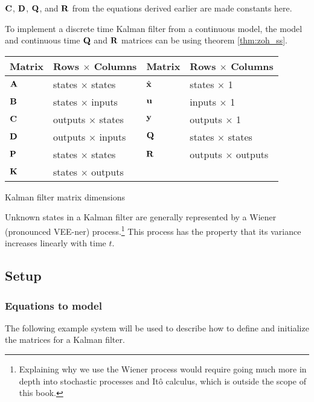 $\mathbf{C}$, $\mathbf{D}$, $\mathbf{Q}$, and $\mathbf{R}$ from the equations derived
earlier are made constants here.
\begin{remark}
  To implement a discrete time Kalman filter from a continuous model, the model
  and continuous time $\mathbf{Q}$ and $\mathbf{R}$ matrices can be
   using theorem \ref{thm:zoh_ss}.
\end{remark}
\begin{booktable}
  \begin{tabular}{|ll|ll|}
    \hline
    \rowcolor{headingbg}
    \textbf{Matrix} & \textbf{Rows $\times$ Columns} &
    \textbf{Matrix} & \textbf{Rows $\times$ Columns} \\
    \hline
    $\mathbf{A}$ & states $\times$ states & $\hat{\mathbf{x}}$ & states $\times$ 1 \\
    $\mathbf{B}$ & states $\times$ inputs & $\mathbf{u}$ & inputs $\times$ 1 \\
    $\mathbf{C}$ & outputs $\times$ states & $\mathbf{y}$ & outputs $\times$ 1 \\
    $\mathbf{D}$ & outputs $\times$ inputs & $\mathbf{Q}$ & states $\times$ states \\
    $\mathbf{P}$ & states $\times$ states & $\mathbf{R}$ & outputs $\times$ outputs \\
    $\mathbf{K}$ & states $\times$ outputs & &
      \\
    \hline
  \end{tabular}
  \caption{Kalman filter matrix dimensions}
\end{booktable}

Unknown \glspl{state} in a Kalman filter are generally represented by a Wiener
(pronounced VEE-ner) process.\footnote{Explaining why we use the Wiener process
would require going much more in depth into stochastic processes and It\^{o}
calculus, which is outside the scope of this book.} This process has the
property that its variance increases linearly with time $t$.

\subsection{Setup}

\subsubsection{Equations to model}

The following example \gls{system} will be used to describe how to define and
initialize the matrices for a Kalman filter.

